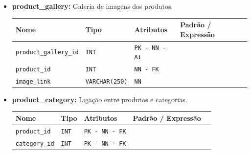 \begin{itemize}
    \vspace{3pt}

    \item \textbf{product\_gallery:}
    Galeria de imagens dos produtos. 
    \begin{table}[H]
        \centering
        \begin{tabularx}{\linewidth}{XXXXX}
        \toprule
        \textbf{\color{color_scheme}Nome} & \textbf{\color{color_scheme}Tipo} & \textbf{\color{color_scheme}Atributos} & \textbf{\color{color_scheme}Padrão / Expressão}\\
        \midrule
        \texttt{product\_gallery\_id} & \texttt{INT} & \texttt{PK - NN - AI} &\\
        \texttt{product\_id} & \texttt{INT} & \texttt{NN - FK} & \\
        \texttt{image\_link} & \texttt{VARCHAR(250)}  & \texttt{NN} & \\
        \bottomrule
        \end{tabularx}
        \label{table: product_gallery}
    \end{table}

    \vspace{3pt}

    \item \textbf{product\_category:}
    Ligação entre produtos e categorias. 
    \begin{table}[H]
        \centering
        \begin{tabularx}{\linewidth}{XXXXX}
        \toprule
        \textbf{\color{color_scheme}Nome} & \textbf{\color{color_scheme}Tipo} & \textbf{\color{color_scheme}Atributos} & \textbf{\color{color_scheme}Padrão / Expressão}\\
        \midrule
        \texttt{product\_id} & \texttt{INT} & \texttt{PK - NN - FK} &\\
        \texttt{category\_id} & \texttt{INT} & \texttt{PK - NN - FK} &\\
        \bottomrule
        \end{tabularx}
        \label{table: product_categories}
    \end{table}
   
    \newpage


\end{itemize}
